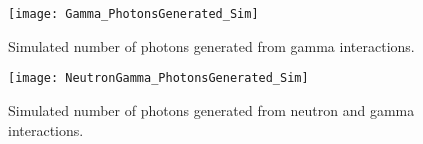\begin{figure}
  \centering
  \texttt{[image: Gamma\_PhotonsGenerated\_Sim]}
  \caption[Number of photons generated from gamma interactions]{Simulated number of photons generated from gamma interactions.}
  \label{fig:GammaPhotonsGenSim}
\end{figure}
\begin{figure}
  \centering
  \texttt{[image: NeutronGamma\_PhotonsGenerated\_Sim]}
  \caption[Number of photons generated of a 1 mm for neutron and gamma interactions]{Simulated number of photons generated from neutron and gamma interactions.}
  \label{fig:NeutronGammaPhotonsGenSim}
\end{figure}
